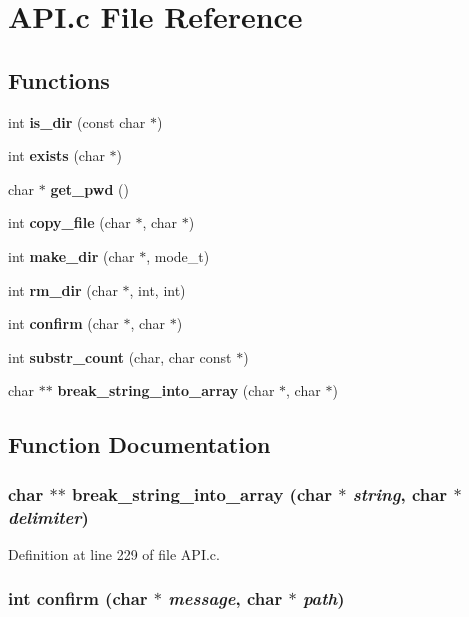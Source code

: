 \section{API.c File Reference}
\label{_a_p_i_8c}
\subsection*{Functions}
\begin{DoxyCompactItemize}
\item 
int {\bf is\_\-dir} (const char $\ast$)
\item 
int {\bf exists} (char $\ast$)
\item 
char $\ast$ {\bf get\_\-pwd} ()
\item 
int {\bf copy\_\-file} (char $\ast$, char $\ast$)
\item 
int {\bf make\_\-dir} (char $\ast$, mode\_\-t)
\item 
int {\bf rm\_\-dir} (char $\ast$, int, int)
\item 
int {\bf confirm} (char $\ast$, char $\ast$)
\item 
int {\bf substr\_\-count} (char, char const $\ast$)
\item 
char $\ast$$\ast$ {\bf break\_\-string\_\-into\_\-array} (char $\ast$, char $\ast$)
\end{DoxyCompactItemize}


\subsection{Function Documentation}
\subsubsection[{break\_\-string\_\-into\_\-array}]{\setlength{\rightskip}{0pt plus 5cm}char $\ast$$\ast$ break\_\-string\_\-into\_\-array (char $\ast$ {\em string}, \/  char $\ast$ {\em delimiter})}\label{_a_p_i_8c_a74362777b9e8cdf0ffeb2bf7dcc7fa38}


Definition at line 229 of file API.c.

\subsubsection[{confirm}]{\setlength{\rightskip}{0pt plus 5cm}int confirm (char $\ast$ {\em message}, \/  char $\ast$ {\em path})}\label{_a_p_i_8c_a9ef1dd18b9d9e57d2ca84b42718b979e}


